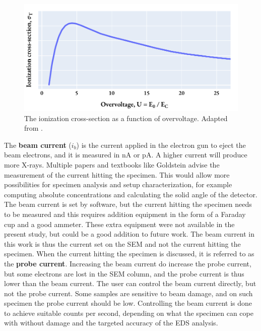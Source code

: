 \begin{figure}[hbt]
    \centering
    \includegraphics[width=0.6\linewidth]{figures/overvoltage2ionizationcrosssection.pdf}
    \caption{
        The ionization cross-section as a function of overvoltage.
        Adapted from \cite[Fig. 4.4]{williams_carter_tem_2009}.
    }
    \label{fig:overvoltage2ionizationcrosssection}
\end{figure}








The \textbf{beam current} ($i_b$) is the current applied in the electron gun to eject the beam electrons, and it is measured in nA or pA.
A higher current will produce more X-rays.
Multiple papers and textbooks like Goldstein advise the measurement of the current hitting the specimen.
This would allow more possibilities for specimen analysis and setup characterization, for example computing absolute concentrations and calculating the solid angle of the detector.
The beam current is set by software, but the current hitting the specimen needs to be measured and this requires addition equipment in the form of a Faraday cup and a good ammeter.
These extra equipment were not available in the present study, but could be a good addition to future work.
The beam current in this work is thus the current set on the SEM and not the current hitting the specimen.
When the current hitting the specimen is discussed, it is referred to as the \textbf{probe current}.
Increasing the beam current do increase the probe current, but some electrons are lost in the SEM column, and the probe current is thus lower than the beam current.
The user can control the beam current directly, but not the probe current.
Some samples are sensitive to beam damage, and on such specimen the probe current should be low.
Controlling the beam current is done to achieve suitable counts per second, depending on what the specimen can cope with without damage and the targeted accuracy of the EDS analysis.


